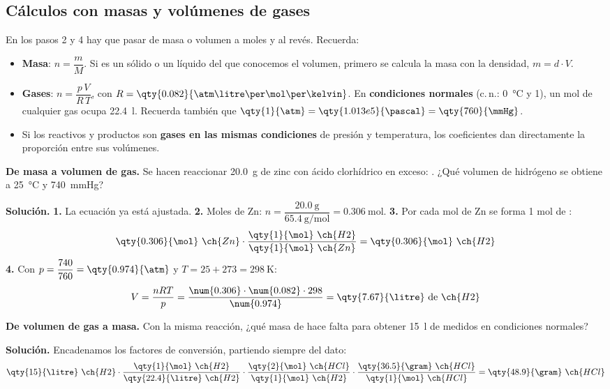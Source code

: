 \subsection{Cálculos con masas y volúmenes de gases}

En los pasos 2 y 4 hay que pasar de masa o volumen a moles y al revés. Recuerda:
\begin{itemize}
    \item \textbf{Masa}: \(n = \dfrac{m}{M}\). Si es un sólido o un líquido del que conocemos el volumen, primero se calcula la masa
    con la densidad, \(m = d \cdot V\).
    \item \textbf{Gases}: \(n = \dfrac{p\,V}{R\,T}\), con \(R = \qty{0.082}{\atm\litre\per\mol\per\kelvin}\). En
    \textbf{condiciones normales} (c.\,n.: \qty{0}{\degreeCelsius} y \qty{1}{\atm}), un mol de cualquier gas ocupa
    \qty{22.4}{\litre}. Recuerda también que \(\qty{1}{\atm} = \qty{1.013e5}{\pascal} = \qty{760}{\mmHg}\).
    \item Si los reactivos y productos son \textbf{gases en las mismas condiciones} de presión y temperatura, los coeficientes dan
    directamente la proporción entre sus volúmenes.
\end{itemize}

\begin{example}
    \textbf{De masa a volumen de gas.} Se hacen reaccionar \qty{20.0}{\gram} de zinc con ácido clorhídrico en exceso:
    . ¿Qué volumen de hidrógeno se obtiene a \qty{25}{\degreeCelsius} y \qty{740}{\mmHg}?

    \textbf{Solución.} \textbf{1.} La ecuación ya está ajustada. \textbf{2.} Moles de Zn: \(n = \dfrac{\qty{20.0}{\gram}}{\qty{65.4}{\gram\per\mol}} =
    \qty{0.306}{\mol}\). \textbf{3.} Por cada mol de Zn se forma 1 mol de :
    \[ \qty{0.306}{\mol}\ \ch{Zn} \cdot \frac{\qty{1}{\mol}\ \ch{H2}}{\qty{1}{\mol}\ \ch{Zn}} = \qty{0.306}{\mol}\ \ch{H2} \]
    \textbf{4.} Con \(p = \dfrac{740}{760} = \qty{0.974}{\atm}\) y \(T = 25 + 273 = \qty{298}{\kelvin}\):
    \[ V = \frac{n R T}{p} = \frac{\num{0.306} \cdot \num{0.082} \cdot 298}{\num{0.974}} = \qty{7.67}{\litre}\ \text{de}\ \ch{H2} \]
\end{example}

\begin{example}
    \textbf{De volumen de gas a masa.} Con la misma reacción, ¿qué masa de  hace falta para obtener \qty{15}{\litre} de
     medidos en condiciones normales?

    \textbf{Solución.} Encadenamos los factores de conversión, partiendo siempre del dato:
    \[ \qty{15}{\litre}\ \ch{H2} \cdot \frac{\qty{1}{\mol}\ \ch{H2}}{\qty{22.4}{\litre}\ \ch{H2}} \cdot
    \frac{\qty{2}{\mol}\ \ch{HCl}}{\qty{1}{\mol}\ \ch{H2}} \cdot \frac{\qty{36.5}{\gram}\ \ch{HCl}}{\qty{1}{\mol}\ \ch{HCl}} =
    \qty{48.9}{\gram}\ \ch{HCl} \]
\end{example}

